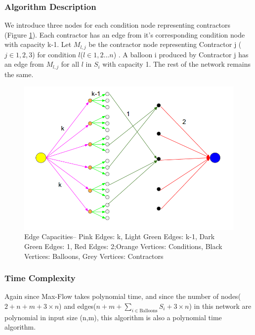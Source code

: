 \documentclass{article}
\begin{document}
\subsubsection{Algorithm Description}
We introduce three nodes for each condition node representing contractors (Figure \ref{dif}). Each contractor has an edge from it's corresponding condition node with capacity k-1. Let $M_{l,j}$ be the contractor node representing Contractor j ($j \in {1,2,3}$) for condition $l$($ l \in {1,2...n}$) . A balloon i produced by Contractor j has an edge from $M_{l,j}$ for all $l$ in $S_i$ with capacity 1. The rest of the network remains the same.
\begin{figure}[h!]
\centering
\includegraphics[width=0.5\columnwidth]{fig_dif.png}
\caption{ Edge Capacities-- Pink Edges: k, Light Green Edges: k-1, Dark Green Edges: 1, Red Edges: 2;\newline Orange Vertices: Conditions, Black Vertices: Balloons, Grey Vertices: Contractors}
\label{dif}
\end{figure}
\subsubsection{Time Complexity}
Again since Max-Flow takes polynomial time, and since the number of nodes($2 + n + m + 3 \times n$) and edges($n + m + \sum_{i \in \text{Balloons}}S_i + 3 \times n$) in this network are polynomial in input size (n,m), this algorithm is also a polynomial time algorithm.
\end{document}
